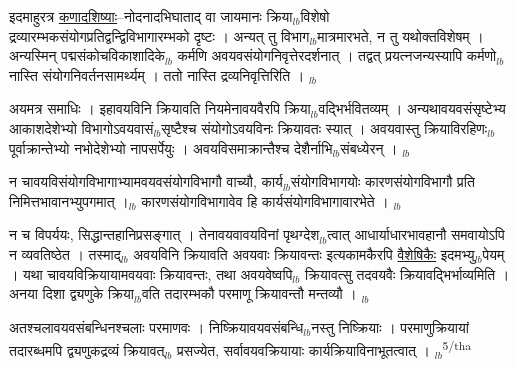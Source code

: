 \documentclass[article,12pt,a4paper]{memoir}%
\newcounter{parCount}
\begin{document}
	  
	  \pstart \leavevmode%
	इदमाहुरत्र \uline{कणादशिष्याः}--नोदनादभिघाताद् वा जायमानः क्रिया{\tiny $_{lb}$}विशेषो द्रव्यारम्भकसंयोगप्रतिद्वन्द्विविभागारम्भको दृष्टः । अन्यत् तु विभाग{\tiny $_{lb}$}मात्रमारभते, न तु यथोक्तविशेषम् । अन्यस्मिन् पद्मसंकोचविकाशादिके{\tiny $_{lb}$} कर्मणि अवयवसंयोगनिवृत्तेरदर्शनात् । तद्वत् प्रयत्नजन्यस्यापि कर्मणो{\tiny $_{lb}$} नास्ति संयोगनिवर्तनसामर्थ्यम् । ततो नास्ति द्रव्यनिवृत्तिरिति ।
	{}
	\pend%
      {\tiny $_{lb}$}

	  
	  \pstart \leavevmode%
	अयमत्र समाधिः । इहावयविनि क्रियावति नियमेनावयवैरपि क्रिया{\tiny $_{lb}$}वद्भिर्भवितव्यम् । अन्यथावयवसंसृष्टेभ्य आकाशदेशेभ्यो विभागोऽवयवासं{\tiny $_{lb}$}सृष्टैश्च संयोगोऽवयविनः क्रियावतः स्यात् । अवयवास्तु क्रियाविरहिणः{\tiny $_{lb}$} पूर्वाक्रान्तेभ्यो नभोदेशेभ्यो नापसर्पेयुः । अवयविसमाक्रान्तैश्च देशैर्नाभि{\tiny $_{lb}$}संबध्येरन् ।
	{}
	\pend%
      {\tiny $_{lb}$}

	  
	  \pstart \leavevmode%
	न चावयविसंयोगविभागाभ्यामवयवसंयोगविभागौ वाच्यौ, कार्य{\tiny $_{lb}$}संयोगविभागयोः कारणसंयोगविभागौ प्रति निमित्तभावानभ्युपगमात् ।{\tiny $_{lb}$} कारणसंयोगविभागावेव हि कार्यसंयोगविभागावारभेते ।
	{}
	\pend%
      {\tiny $_{lb}$}

	  
	  \pstart \leavevmode%
	न च विपर्ययः, सिद्धान्तहानिप्रसङ्गात् । तेनावयवावयविनां पृथग्देश{\tiny $_{lb}$}त्वात् \leavevmode{} आधार्याधारभावहानौ समवायोऽपि न व्यवतिष्ठेत । तस्माद्{\tiny $_{lb}$} अवयविनि क्रियावति अवयवाः क्रियावन्तः इत्यकामकैरपि \uline{वैशेषिकैः} इदमभ्यु{\tiny $_{lb}$}पेयम् । यथा चावयविक्रियायामवयवाः क्रियावन्तः, तथा अवयवेष्वपि{\tiny $_{lb}$} क्रियावत्सु तदवयवैः क्रियावद्भिर्भाव्यमिति । अनया दिशा द्व्यणुके क्रिया{\tiny $_{lb}$}वति तदारम्भकौ परमाणू क्रियावन्तौ मन्तव्यौ ।
	{}
	\pend%
      {\tiny $_{lb}$}

	  
	  \pstart \leavevmode%
	अतश्चलावयवसंबन्धिनश्चलाः परमाणवः । निष्क्रियावयवसंबन्धि{\tiny $_{lb}$}नस्तु निष्क्रियाः । परमाणुक्रियायां तदारब्धमपि द्व्यणुकद्रव्यं क्रियावत्{\tiny $_{lb}$} प्रसज्येत, सर्वावयवक्रियायाः कार्यक्रियाविनाभूतत्वात् ।
	{}
	\pend%
      {\tiny $_{lb}$}\textsuperscript{\textenglish{5/tha}}
\end{document}
